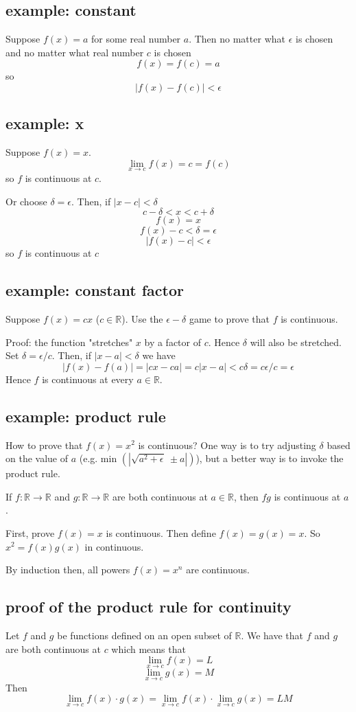 \documentclass[11pt, oneside]{article}
\begin{document}
\subsection*{example:  constant}
Suppose $f(x) = a$ for some real number $a$.  Then no matter what $\epsilon$ is chosen and no matter what real number $c$ is chosen
\[ f(x) = f(c) = a \]
so
\[ |f(x) - f(c)| < \epsilon \]

\subsection*{example:  x}
Suppose $f(x) = x$.  
\[ \lim_{x \rightarrow c} f(x) = c  = f(c) \]
so $f$ is continuous at $c$.

Or choose $\delta = \epsilon$.  Then, if $|x-c| < \delta$
\[ c- \delta < x < c + \delta \]
\[ f(x) = x \]
\[ f(x) - c < \delta = \epsilon \]
\[ | f(x) - c | < \epsilon \]
so $f$ is continuous at $c$

\subsection*{example:  constant factor}
Suppose $f(x) = cx$ ($c \in \mathbb{R}$).  Use the $\epsilon-\delta$ game to prove that $f$ is continuous.

Proof:  the function "stretches" $x$ by a factor of $c$.  Hence $\delta$ will also be stretched.  Set $\delta = \epsilon/c$.  Then, if $|x-a| < \delta$ we have
\[ |f(x) - f(a)| = |cx - ca| = c |x-a| < c \delta = c \epsilon / c = \epsilon \]
Hence $f$ is continuous at every $a \in \mathbb{R}$.

\subsection*{example:  product rule}
How to prove that $f(x) = x^2$ is continuous?  One way is to try adjusting $\delta$ based on the value of $a$ (e.g. min $(| \sqrt{a^2 + \epsilon} \ \pm a|)$), but a better way is to invoke the product rule.

If $f: \mathbb{R} \rightarrow \mathbb{R}$ and $g: \mathbb{R} \rightarrow \mathbb{R}$ are both continuous at $a \in  \mathbb{R}$, then $fg$ is continuous at $a$.

First, prove $f(x) = x$ is continuous.  Then define $f(x) = g(x) = x$.  So $x^2 = f(x) g(x)$ in continuous.

By induction then, all powers $f(x) = x^n$ are continuous.

\subsection*{proof of the product rule for continuity}
Let $f$ and $g$ be functions defined on an open subset of $\mathbb{R}$.  We have that $f$ and $g$ are both continuous at $c$ which means that
\[ \lim_{x \rightarrow c} f(x) = L \]
\[ \lim_{x \rightarrow c} g(x) = M \]
Then
\[ \lim_{x \rightarrow c} f(x) \cdot g(x) = \lim_{x \rightarrow c} f(x) \cdot \lim_{x \rightarrow c} g(x) = LM \]
\end{document}

